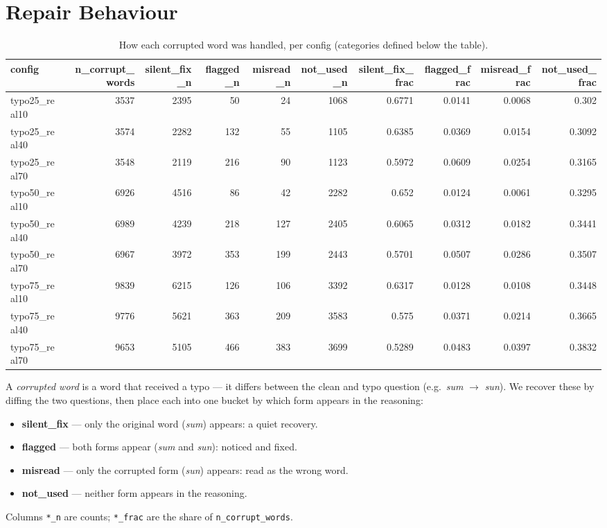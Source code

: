 \documentclass[11pt]{article}
\begin{document}
\section*{Repair Behaviour}
\begin{table}[H]
\centering
\caption{How each corrupted word was handled, per config (categories defined below the table).}
\small
\begin{adjustbox}{max width=\textwidth}
\begin{tabular}{lrrrrrrrrr}
\toprule
\textbf{config} & \textbf{n\_corrupt\_words} & \textbf{silent\_fix\_n} & \textbf{flagged\_n} & \textbf{misread\_n} & \textbf{not\_used\_n} & \textbf{silent\_fix\_frac} & \textbf{flagged\_frac} & \textbf{misread\_frac} & \textbf{not\_used\_frac} \\
\midrule
typo25\_real10 & 3537 & 2395 & 50 & 24 & 1068 & 0.6771 & 0.0141 & 0.0068 & 0.302 \\
typo25\_real40 & 3574 & 2282 & 132 & 55 & 1105 & 0.6385 & 0.0369 & 0.0154 & 0.3092 \\
typo25\_real70 & 3548 & 2119 & 216 & 90 & 1123 & 0.5972 & 0.0609 & 0.0254 & 0.3165 \\
typo50\_real10 & 6926 & 4516 & 86 & 42 & 2282 & 0.652 & 0.0124 & 0.0061 & 0.3295 \\
typo50\_real40 & 6989 & 4239 & 218 & 127 & 2405 & 0.6065 & 0.0312 & 0.0182 & 0.3441 \\
typo50\_real70 & 6967 & 3972 & 353 & 199 & 2443 & 0.5701 & 0.0507 & 0.0286 & 0.3507 \\
typo75\_real10 & 9839 & 6215 & 126 & 106 & 3392 & 0.6317 & 0.0128 & 0.0108 & 0.3448 \\
typo75\_real40 & 9776 & 5621 & 363 & 209 & 3583 & 0.575 & 0.0371 & 0.0214 & 0.3665 \\
typo75\_real70 & 9653 & 5105 & 466 & 383 & 3699 & 0.5289 & 0.0483 & 0.0397 & 0.3832 \\
\bottomrule
\end{tabular}
\end{adjustbox}
\end{table}

\noindent A \emph{corrupted word} is a word that received a
typo --- it differs between the clean and typo question (e.g.\ \emph{sum} $\to$
\emph{sun}). We recover these by diffing the two questions, then place each into one
bucket by which form appears in the reasoning:
\begin{itemize}\setlength{\itemsep}{1pt}
  \item \textbf{silent\_fix} --- only the original word (\emph{sum}) appears: a quiet recovery.
  \item \textbf{flagged} --- both forms appear (\emph{sum} and \emph{sun}): noticed and fixed.
  \item \textbf{misread} --- only the corrupted form (\emph{sun}) appears: read as the wrong word.
  \item \textbf{not\_used} --- neither form appears in the reasoning.
\end{itemize}
\noindent Columns \texttt{*\_n} are counts; \texttt{*\_frac} are the share of
\texttt{n\_corrupt\_words}.
\medskip
\end{document}
